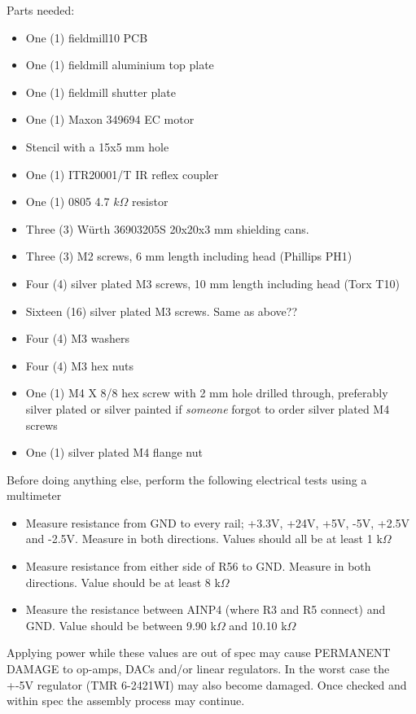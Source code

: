 \documentclass{article}
\begin{document}
Parts needed:

\begin{itemize}
\item One (1) fieldmill10 PCB
\item One (1) fieldmill aluminium top plate
\item One (1) fieldmill shutter plate
\item One (1) Maxon 349694 EC motor
\item Stencil with a 15x5 mm hole
\item One (1) ITR20001/T IR reflex coupler
\item One (1) 0805 4.7 $k\Omega$ resistor
\item Three (3) Würth 36903205S 20x20x3 mm shielding cans.
\item Three (3) M2 screws, 6 mm length including head (Phillips PH1)
\item Four (4) silver plated M3 screws, 10 mm length including head (Torx T10)
\item Sixteen (16) silver plated M3 screws. Same as above??
\item Four (4) M3 washers
\item Four (4) M3 hex nuts
\item One (1) M4 X 8/8 hex screw with 2 mm hole drilled through, preferably silver plated or silver painted if {\it someone} forgot to order silver plated M4 screws
\item One (1) silver plated M4 flange nut
\end{itemize}

Before doing anything else, perform the following electrical tests using a multimeter

\begin{itemize}
\item Measure resistance from GND to every rail; +3.3V, +24V, +5V, -5V, +2.5V and -2.5V. Measure in both directions. Values should all be at least 1 k$\Omega$
\item Measure resistance from either side of R56 to GND. Measure in both directions. Value should be at least 8 k$\Omega$
\item Measure the resistance between AINP4 (where R3 and R5 connect) and GND. Value should be between 9.90 k$\Omega$ and 10.10 k$\Omega$
\end{itemize}

Applying power while these values are out of spec may cause PERMANENT DAMAGE to op-amps, DACs and/or linear regulators.
In the worst case the +-5V regulator (TMR 6-2421WI) may also become damaged.
Once checked and within spec the assembly process may continue.
\end{document}
